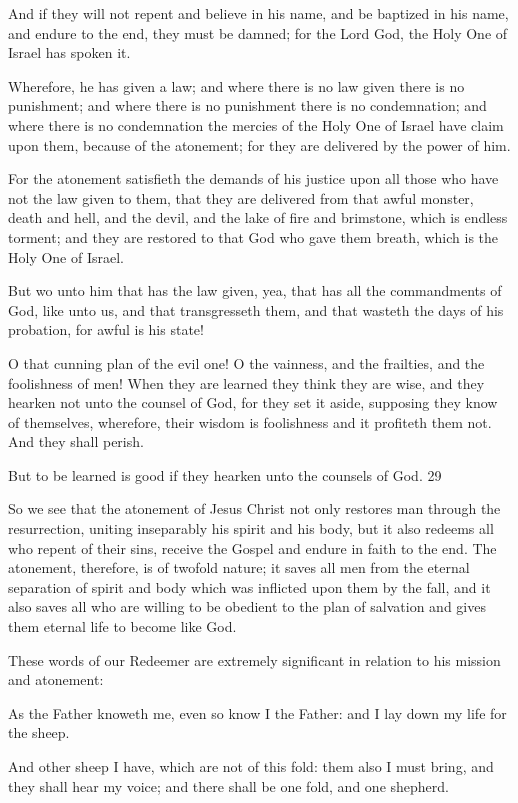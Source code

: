 And if they will not repent and believe in his name, and be baptized in his name, and endure
to the end, they must be damned; for the Lord God, the Holy One of Israel has spoken it.

Wherefore, he has given a law; and where there is no law given there is no punishment; and
where there is no punishment there is no condemnation; and where there is no condemnation
the mercies of the Holy One of Israel have claim upon them, because of the atonement; for
they are delivered by the power of him.

For the atonement satisfieth the demands of his justice upon all those who have not the law
given to them, that they are delivered from that awful monster, death and hell, and the devil,
and the lake of fire and brimstone, which is endless torment; and they are restored to that
God who gave them breath, which is the Holy One of Israel.

But wo unto him that has the law given, yea, that has all the commandments of God, like
unto us, and that transgresseth them, and that wasteth the days of his probation, for awful is
his state!

O that cunning plan of the evil one! O the vainness, and the frailties, and the foolishness of
men! When they are learned they think they are wise, and they hearken not unto the counsel
of God, for they set it aside, supposing they know of themselves, wherefore, their wisdom is
foolishness and it profiteth them not. And they shall perish.

But to be learned is good if they hearken unto the counsels of God. 29

So we see that the atonement of Jesus Christ not only restores man through the resurrection,
uniting inseparably his spirit and his body, but it also redeems all who repent of their sins,
receive the Gospel and endure in faith to the end. The atonement, therefore, is of twofold
nature; it saves all men from the eternal separation of spirit and body which was inflicted
upon them by the fall, and it also saves all who are willing to be obedient to the plan of
salvation and gives them eternal life to become like God.

These words of our Redeemer are extremely significant in relation to his mission and
atonement:

As the Father knoweth me, even so know I the Father: and I lay down my life for the sheep.

And other sheep I have, which are not of this fold: them also I must bring, and they shall hear
my voice; and there shall be one fold, and one shepherd.

